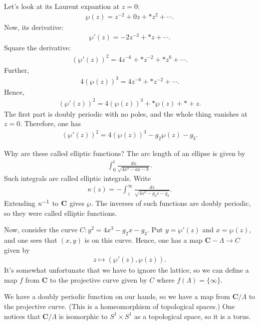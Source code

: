 \documentclass [11 pt, oneside, margin = 1 in] {article}
\begin{document}
Let's look at its Laurent expantion at $z=0$:
\begin{align*}
	\wp(z) = z^{-2} + 0 z + *z^2 + \cdots.
\end{align*}
Now, its derivative:
\begin{align*}
	\wp'(z) = -2z^{-3} + *z +\cdots.
\end{align*}
Square the derivative:
\begin{align*}
	(\wp'(z)) ^2 = 4z^{-6} + *z^{-2} + *z^0 + \cdots.
\end{align*}
Further,
\begin{align*}
	4(\wp(z)) ^3 = 4z^{-6} + *z^{-2} + \cdots.
\end{align*}
Hence,
\begin{align*}
	(\wp'(z)) ^2 = 4(\wp(z)) ^3 +  *\wp(z) + * + z.
\end{align*}
The first part is doubly periodic with no poles, and the whole thing vanishes at $z=0$. Therefore, one has
\begin{align*}
	(\wp'(z)) ^2 = 4(\wp(z)) ^3 - g_2 \wp(z) -  g_3.
\end{align*}

Why are these called elliptic functions? The arc length of an ellipse is given by 
\begin{align*}
	\int_{0}^{t} \frac{dx}{\sqrt{4x^3 - ax - b} }. 
\end{align*}
Such integrals are called elliptic integrals. Write
\begin{align*}
	\kappa(z) = -\int_{z}^{\infty} \frac{ds}{\sqrt{4s^3 -g_2s - g_3} }. 
\end{align*}
Extending $\kappa^{-1}$ to $\mathbf C$ gives $\wp$. The inverses of such functions are doubly periodic, so they were called elliptic functions.

Now, consider the curve $C:y^2 = 4x^3 - g_2x-g_3$. Put $y=\wp'(z)$ and $x=\wp(z)$, and one sees that $(x,y)$ is on this curve. Hence, one has a map $\mathbf{C}-\Lambda \longrightarrow C$ given by
\begin{align*}
	z\longmapsto (\wp'(z),\wp (z)).
\end{align*}
It's somewhat unfortunate that we have to ignore the lattice, so we can define a map $f$ from $\mathbf{C}$ to the projective curve given by $C$ where $f(\Lambda) = \{\infty\}$. 

We have a doubly periodic function on our hands, so we have a map from $\mathbf{C}/\Lambda$ to the projective curve. (This is a homeomorphism of topological spaces.) One notices that $\mathbf{C}/\Lambda$ is isomorphic to $S^1\times S^1$ as a topological space, so it is a torus.
\end{document}
